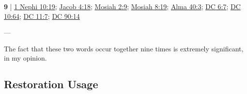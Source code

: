 	\begin{compactdesc}
		\item[unfold mystery] \textbf{9} | \hyperref[1NEPHI-10-19]{1 Nephi 10:19}; \hyperref[JACOB-4-18]{Jacob 4:18}; \hyperref[MOSIAH-2-9]{Mosiah 2:9}; \hyperref[MOSIAH-8-19]{Mosiah 8:19}; \hyperref[ALMA-40-3]{Alma 40:3}; \hyperref[DC6-7]{DC 6:7}; \hyperref[DC10-64]{DC 10:64}; \hyperref[DC11-7]{DC 11:7}; \hyperref[DC90-14]{DC 90:14}
			\begin{compactdesc}
				\item[Bible anchor verses] ---
				\item[Commentary] The fact that these two words occur together nine times is extremely significant, in my opinion.
			\end{compactdesc}
	\end{compactdesc}
	

\subsection{Restoration Usage} %
	\label{UNFOLD-RESTORATION}

	
		
	
	
